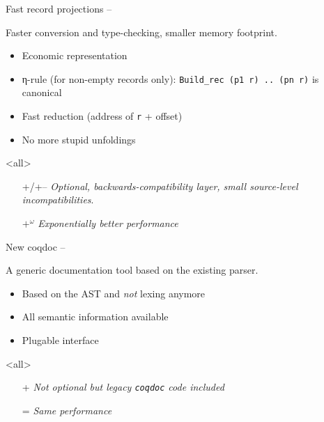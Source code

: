 
\begin{subsecframefragile}{Fast record projections -- }

  \begin{center}
    Faster conversion and type-checking, smaller memory
    footprint.
  \end{center}
  
  \begin{itemize}
  \item Economic representation
  \item η-rule (for non-empty records only): 
    \verb|Build_rec (p1 r) .. (pn r)| is canonical
  \item Fast reduction (address of \verb|r| + offset)
  \item<article> No more stupid unfoldings
  \end{itemize}
  \mode<all>
    
  \begin{itemize}
  \item[+/+--] \emph{Optional, backwards-compatibility layer,
      small source-level incompatibilities}.
  \item[${+}^{ω}$] \emph{Exponentially better performance}
  \end{itemize}

\end{subsecframefragile}


\begin{subsecframe}{New coqdoc -- }

  \begin{center}
    A generic documentation tool based on the existing \Coq parser.
  \end{center}
  \begin{itemize}
  \item Based on the AST and \alert{\emph{not}} lexing anymore
  \item All semantic information available
  \item Plugable interface
  \end{itemize}
  \mode<all>

  \begin{itemize}
  \item[+] \emph{Not optional but legacy \texttt{coqdoc} code included}
  \item[=] \emph{Same performance}
  \end{itemize}
  
\end{subsecframe}

